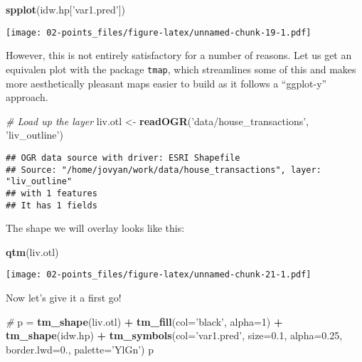 \documentclass[]{book}
\newenvironment{Shaded}{\begin{snugshade}}{\end{snugshade}}
\newcommand{\CommentTok}[1]{\textcolor[rgb]{0.56,0.35,0.01}{\textit{#1}}}
\newcommand{\DataTypeTok}[1]{\textcolor[rgb]{0.13,0.29,0.53}{#1}}
\newcommand{\DecValTok}[1]{\textcolor[rgb]{0.00,0.00,0.81}{#1}}
\newcommand{\FloatTok}[1]{\textcolor[rgb]{0.00,0.00,0.81}{#1}}
\newcommand{\KeywordTok}[1]{\textcolor[rgb]{0.13,0.29,0.53}{\textbf{#1}}}
\newcommand{\NormalTok}[1]{#1}
\newcommand{\OperatorTok}[1]{\textcolor[rgb]{0.81,0.36,0.00}{\textbf{#1}}}
\newcommand{\StringTok}[1]{\textcolor[rgb]{0.31,0.60,0.02}{#1}}
\begin{document}
\begin{Shaded}
\begin{Highlighting}[]
\KeywordTok{spplot}\NormalTok{(idw.hp[}\StringTok{'var1.pred'}\NormalTok{])}
\end{Highlighting}
\end{Shaded}

\texttt{[image: 02-points\_files/figure-latex/unnamed-chunk-19-1.pdf]}

However, this is not entirely satisfactory for a number of reasons. Let us get an equivalen plot with the package \texttt{tmap}, which streamlines some of this and makes more aesthetically pleasant maps easier to build as it follows a ``ggplot-y'' approach.

\begin{Shaded}
\begin{Highlighting}[]
\CommentTok{# Load up the layer}
\NormalTok{liv.otl <-}\StringTok{ }\KeywordTok{readOGR}\NormalTok{(}\StringTok{'data/house_transactions'}\NormalTok{, }\StringTok{'liv_outline'}\NormalTok{)}
\end{Highlighting}
\end{Shaded}

\begin{verbatim}
## OGR data source with driver: ESRI Shapefile 
## Source: "/home/jovyan/work/data/house_transactions", layer: "liv_outline"
## with 1 features
## It has 1 fields
\end{verbatim}

The shape we will overlay looks like this:

\begin{Shaded}
\begin{Highlighting}[]
\KeywordTok{qtm}\NormalTok{(liv.otl)}
\end{Highlighting}
\end{Shaded}

\texttt{[image: 02-points\_files/figure-latex/unnamed-chunk-21-1.pdf]}

Now let's give it a first go!

\begin{Shaded}
\begin{Highlighting}[]
\CommentTok{# }
\NormalTok{p =}\StringTok{ }\KeywordTok{tm_shape}\NormalTok{(liv.otl) }\OperatorTok{+}\StringTok{ }\KeywordTok{tm_fill}\NormalTok{(}\DataTypeTok{col=}\StringTok{'black'}\NormalTok{, }\DataTypeTok{alpha=}\DecValTok{1}\NormalTok{) }\OperatorTok{+}
\StringTok{  }\KeywordTok{tm_shape}\NormalTok{(idw.hp) }\OperatorTok{+}\StringTok{ }
\StringTok{  }\KeywordTok{tm_symbols}\NormalTok{(}\DataTypeTok{col=}\StringTok{'var1.pred'}\NormalTok{, }\DataTypeTok{size=}\FloatTok{0.1}\NormalTok{, }\DataTypeTok{alpha=}\FloatTok{0.25}\NormalTok{, }
             \DataTypeTok{border.lwd=}\FloatTok{0.}\NormalTok{, }\DataTypeTok{palette=}\StringTok{'YlGn'}\NormalTok{)}
\NormalTok{p}
\end{Highlighting}
\end{Shaded}
\end{document}
